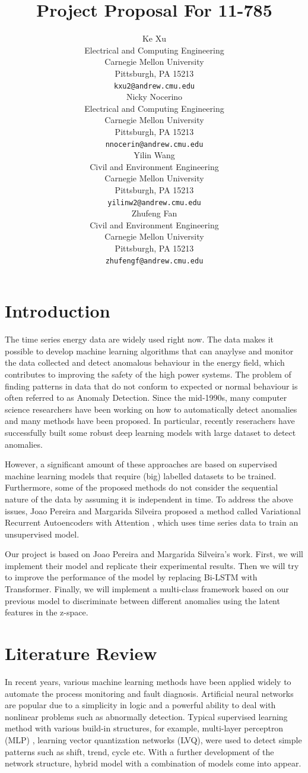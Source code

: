 \documentclass{article}
\title{Project Proposal For 11-785}
\author{%
  Ke Xu \\
  Electrical and Computing Engineering\\
  Carnegie Mellon University\\
  Pittsburgh, PA 15213 \\
  \texttt{kxu2@andrew.cmu.edu} \\

  \And
  Nicky Nocerino \\
  Electrical and Computing Engineering\\
  Carnegie Mellon University\\
  Pittsburgh, PA 15213 \\
  \texttt{nnocerin@andrew.cmu.edu} \\

  \And
  Yilin Wang \\
  Civil and Environment Engineering\\
  Carnegie Mellon University\\
  Pittsburgh, PA 15213 \\
  \texttt{yilinw2@andrew.cmu.edu} \\

  \And
  Zhufeng Fan \\
  Civil and Environment Engineering\\
  Carnegie Mellon University\\
  Pittsburgh, PA 15213 \\
  \texttt{zhufengf@andrew.cmu.edu} \\
}
\begin{document}
\maketitle

\section{Introduction}
The time series energy data are widely used right now. The data makes it possible to develop machine learning algorithms that can anaylyse and monitor the data collected and detect anomalous behaviour in the energy field, which contributes to improving the safety of the high power systems. The problem of finding patterns in data that do not conform to expected or normal behaviour is often referred to as Anomaly Detection. Since the mid-1990s, many computer science researchers have been working on how to automatically detect anomalies and many methods have been proposed. In particular, recently reserachers have successfully built some robust deep learning models with large dataset to detect anomalies. 

However, a significant amount of these approaches are based on supervised machine learning models that require (big) labelled datasets to be trained. Furthermore, some of the proposed methods do not consider the sequential nature of the data by assuming it is independent in time. To address the above issues, Joao Pereira and Margarida Silveira proposed a method called Variational Recurrent Autoencoders with Attention \cite{AuthorJM}, which uses time series data to train an unsupervised model. 

Our project is based on Joao Pereira and Margarida Silveira's work. First, we will implement their model and replicate their experimental results. Then we will try to improve the performance of the model by replacing Bi-LSTM with Transformer. Finally, we will implement a multi-class framework based on our previous model to discriminate between different anomalies using the latent features in the z-space.

\section{Literature Review}
In recent years, various machine learning methods have been applied widely to automate the process monitoring and fault diagnosis. Artificial neural networks are popular due to a simplicity in logic and a powerful ability to deal with nonlinear problems such as abnormally detection. Typical supervised learning method with various build-in structures, for example, multi-layer perceptron (MLP) \cite{AuthorSI}, learning vector quantization networks (LVQ), were used to detect simple patterns such as shift, trend, cycle etc. With a further development of the network structure, hybrid model with a combination of models come into appear.
\end{document}
